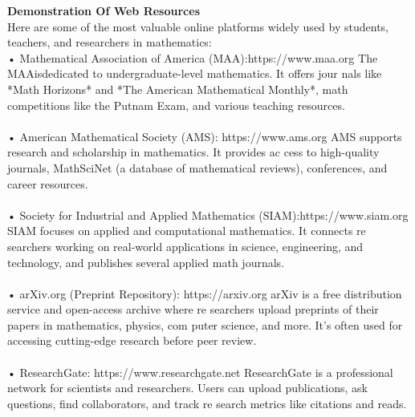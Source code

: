 \documentclass{report}
\begin{document}
\textbf{Demonstration Of Web Resources}\\
 Here are some of the most valuable online platforms widely used by students,
 teachers, and researchers in mathematics:\\
 • Mathematical Association of America (MAA):https://www.maa.org
 The MAAisdedicated to undergraduate-level mathematics. It offers jour
nals like *Math Horizons* and *The American Mathematical Monthly*,
 math competitions like the Putnam Exam, and various teaching resources.\\\\
 • American Mathematical Society (AMS): https://www.ams.org
 AMS supports research and scholarship in mathematics. It provides ac
cess to high-quality journals, MathSciNet (a database of mathematical
 reviews), conferences, and career resources.\\\\
 • Society for Industrial and Applied Mathematics (SIAM):https://www.siam.org
 SIAM focuses on applied and computational mathematics. It connects re
searchers working on real-world applications in science, engineering, and
 technology, and publishes several applied math journals.\\\\
 • arXiv.org (Preprint Repository): https://arxiv.org
 arXiv is a free distribution service and open-access archive where re
searchers upload preprints of their papers in mathematics, physics, com
puter science, and more. It’s often used for accessing cutting-edge research
 before peer review.\\\\
 • ResearchGate: https://www.researchgate.net
 ResearchGate is a professional network for scientists and researchers. Users
 can upload publications, ask questions, find collaborators, and track re
search metrics like citations and reads.
\end{document}
